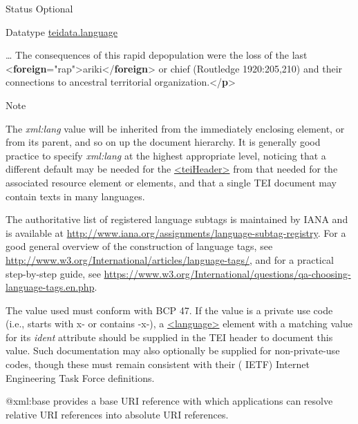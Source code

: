 \begin{reflist}
\begin{sansreflist}
\begin{reflist}
    \item[{Status}]
  Optional
    \item[{Datatype}]
  \hyperref[TEI.teidata.language]{teidata.language}
    \item[] … The consequences of\mbox{}\newline 
 this rapid depopulation were the loss of the last\mbox{}\newline 
{<\textbf{foreign}\hspace*{1em}{xml:lang}="{rap}">}ariki{</\textbf{foreign}>} or chief\mbox{}\newline 
 (Routledge 1920:205,210) and their connections to\mbox{}\newline 
 ancestral territorial organization.{</\textbf{p}>}
    \item[{Note}]
  \par
The {\itshape xml:lang} value will be inherited from the immediately enclosing element, or from its parent, and so on up the document hierarchy. It is generally good practice to specify {\itshape xml:lang} at the highest appropriate level, noticing that a different default may be needed for the \hyperref[TEI.teiHeader]{<teiHeader>} from that needed for the associated resource element or elements, and that a single TEI document may contain texts in many languages.\par
The authoritative list of registered language subtags is maintained by IANA and is available at \url{http://www.iana.org/assignments/language-subtag-registry}. For a good general overview of the construction of language tags, see \url{http://www.w3.org/International/articles/language-tags/}, and for a practical step-by-step guide, see \url{https://www.w3.org/International/questions/qa-choosing-language-tags.en.php}.\par
The value used must conform with BCP 47. If the value is a private use code (i.e., starts with x- or contains -x-), a \hyperref[TEI.language]{<language>} element with a matching value for its {\itshape ident} attribute should be supplied in the TEI header to document this value. Such documentation may also optionally be supplied for non-private-use codes, though these must remain consistent with their  ( {\abbr IETF}) {\expan Internet Engineering Task Force} definitions.
\end{reflist}  
    \item[@xml:base]
  provides a base URI reference with which applications can resolve relative URI references into absolute URI references.

\end{sansreflist}
\end{reflist}
